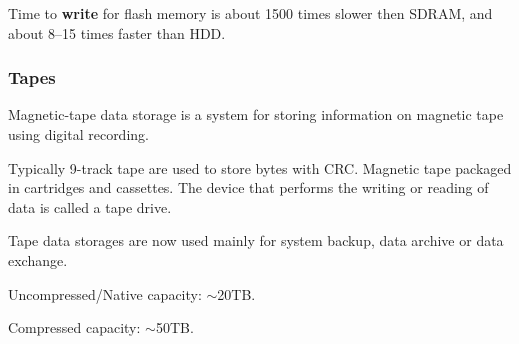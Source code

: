 Time to {\bf write} for flash memory is about 1500 times slower then SDRAM, and about 8–15 times faster than HDD.

\subsubsection{Tapes}

Magnetic-tape data storage is a system for storing  information on magnetic tape using digital recording.

Typically  9-track tape are used to store bytes with CRC. Magnetic tape  packaged in cartridges and cassettes. The device that performs the writing or reading of data is called a tape drive.

Tape data storages are now used mainly for system backup, data archive or data exchange.

Uncompressed/Native capacity: $\sim$20TB.

Compressed capacity: $\sim$50TB.




